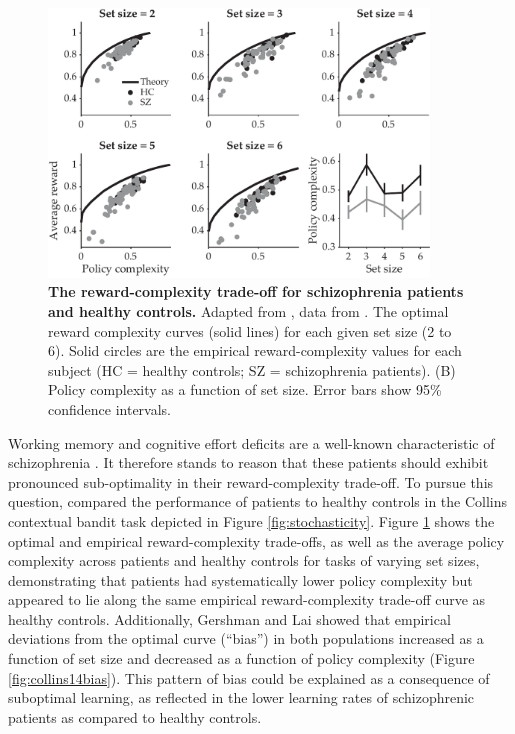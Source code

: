 \documentclass[11pt]{article}
\begin{document}
\begin{figure}
    \centering
    \includegraphics[width=0.9\textwidth]{figs/collins14main.pdf}
            \caption{\textbf{The reward-complexity trade-off for schizophrenia patients and healthy controls.} Adapted from \cite{gershmanlai20}, data from \cite{collins14}. The optimal reward complexity curves (solid lines) for each given set size (2 to 6). Solid circles are the empirical reward-complexity values for each subject (HC = healthy controls; SZ = schizophrenia patients). (B) Policy complexity as a function of set size. Error bars show 95\% confidence intervals.}
    \label{fig:collins14main}
\end{figure}

Working memory and cognitive effort deficits are a well-known characteristic of schizophrenia \citep{culbreth18,forbes09}. It therefore stands to reason that these patients should exhibit pronounced sub-optimality in their reward-complexity trade-off. To pursue this question, \cite{gershmanlai20} compared the performance of patients to healthy controls in the Collins contextual bandit task depicted in Figure \ref{fig:stochasticity}. Figure \ref{fig:collins14main} shows the optimal and empirical reward-complexity trade-offs, as well as the average policy complexity across patients and healthy controls for tasks of varying set sizes, demonstrating that patients had systematically lower policy complexity but appeared to lie along the same empirical reward-complexity trade-off curve as healthy controls. Additionally, Gershman and Lai showed that empirical deviations from the optimal curve (``bias'') in both populations increased as a function of set size and decreased as a function of policy complexity (Figure \ref{fig:collins14bias}). This pattern of bias could be explained as a consequence of suboptimal learning, as reflected in the lower learning rates of schizophrenic patients as compared to healthy controls. 
\end{document}
